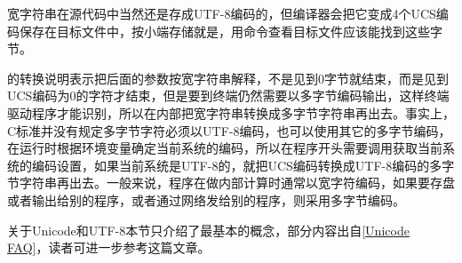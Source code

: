 

宽字符串在源代码中当然还是存成UTF-8编码的，但编译器会把它变成4个UCS编码保存在目标文件中，按小端存储就是，用命令查看目标文件应该能找到这些字节。




的转换说明表示把后面的参数按宽字符串解释，不是见到0字节就结束，而是见到UCS编码为0的字符才结束，但是要到终端仍然需要以多字节编码输出，这样终端驱动程序才能识别，所以在内部把宽字符串转换成多字节字符串再出去。事实上，C标准并没有规定多字节字符必须以UTF-8编码，也可以使用其它的多字节编码，在运行时根据环境变量确定当前系统的编码，所以在程序开头需要调用获取当前系统的编码设置，如果当前系统是UTF-8的，就把UCS编码转换成UTF-8编码的多字节字符串再出去。一般来说，程序在做内部计算时通常以宽字符编码，如果要存盘或者输出给别的程序，或者通过网络发给别的程序，则采用多字节编码。



关于Unicode和UTF-8本节只介绍了最基本的概念，部分内容出自\hyperlink{db.bi01.bibli.unicodefaq}{[Unicode FAQ]}，读者可进一步参考这篇文章。

